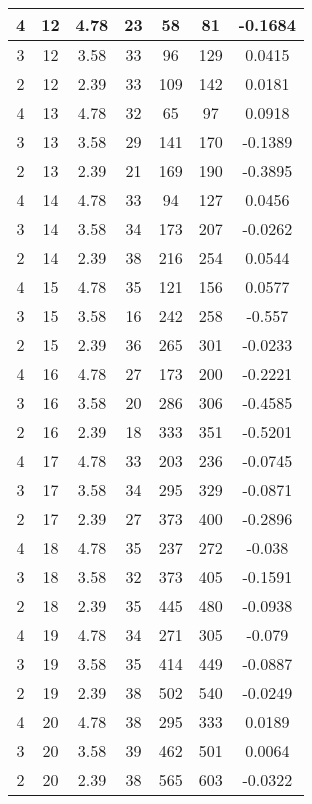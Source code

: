 \documentclass[letterpaper, 12pt]{article}
\begin{document}
\begin{longtable}{|c|c|c|c|c|c|c|}
\hline
4 & 12 & 4.78 & 23 & 58 & 81 & -0.1684 \\
\hline
3 & 12 & 3.58 & 33 & 96 & 129 & 0.0415 \\
\hline
2 & 12 & 2.39 & 33 & 109 & 142 & 0.0181 \\
\hline
4 & 13 & 4.78 & 32 & 65 & 97 & 0.0918 \\
\hline
3 & 13 & 3.58 & 29 & 141 & 170 & -0.1389 \\
\hline
2 & 13 & 2.39 & 21 & 169 & 190 & -0.3895 \\
\hline
4 & 14 & 4.78 & 33 & 94 & 127 & 0.0456 \\
\hline
3 & 14 & 3.58 & 34 & 173 & 207 & -0.0262 \\
\hline
2 & 14 & 2.39 & 38 & 216 & 254 & 0.0544 \\
\hline
4 & 15 & 4.78 & 35 & 121 & 156 & 0.0577 \\
\hline
3 & 15 & 3.58 & 16 & 242 & 258 & -0.557 \\
\hline
2 & 15 & 2.39 & 36 & 265 & 301 & -0.0233 \\
\hline
4 & 16 & 4.78 & 27 & 173 & 200 & -0.2221 \\
\hline
3 & 16 & 3.58 & 20 & 286 & 306 & -0.4585 \\
\hline
2 & 16 & 2.39 & 18 & 333 & 351 & -0.5201 \\
\hline
4 & 17 & 4.78 & 33 & 203 & 236 & -0.0745 \\
\hline
3 & 17 & 3.58 & 34 & 295 & 329 & -0.0871 \\
\hline
2 & 17 & 2.39 & 27 & 373 & 400 & -0.2896 \\
\hline
4 & 18 & 4.78 & 35 & 237 & 272 & -0.038 \\
\hline
3 & 18 & 3.58 & 32 & 373 & 405 & -0.1591 \\
\hline
2 & 18 & 2.39 & 35 & 445 & 480 & -0.0938 \\
\hline
4 & 19 & 4.78 & 34 & 271 & 305 & -0.079 \\
\hline
3 & 19 & 3.58 & 35 & 414 & 449 & -0.0887 \\
\hline
2 & 19 & 2.39 & 38 & 502 & 540 & -0.0249 \\
\hline
4 & 20 & 4.78 & 38 & 295 & 333 & 0.0189 \\
\hline
3 & 20 & 3.58 & 39 & 462 & 501 & 0.0064 \\
\hline
2 & 20 & 2.39 & 38 & 565 & 603 & -0.0322 \\
\hline
\end{longtable}
\end{document}
